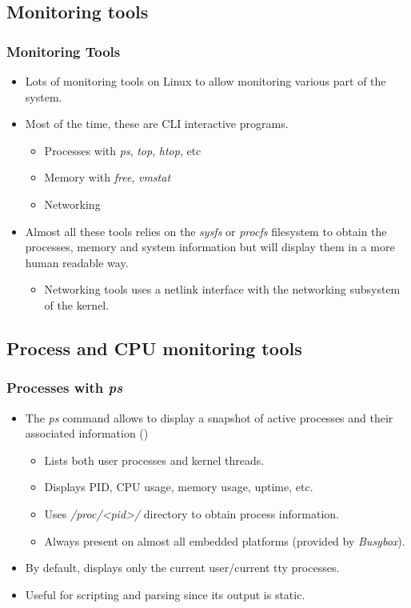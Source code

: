 \subsection{Monitoring tools}

\begin{frame}
  \frametitle{Monitoring Tools}
  \begin{itemize}
    \item Lots of monitoring tools on Linux to allow monitoring various part of
          the system.
    \item Most of the time, these are CLI interactive programs.
    \begin{itemize}
        \item Processes with {\em ps}, {\em top}, {\em htop}, etc
        \item Memory with {\em free}, {\em vmstat}
        \item Networking
    \end{itemize}
    \item Almost all these tools relies on the {\em sysfs} or {\em procfs}
          filesystem to obtain the processes, memory and system information but
          will display them in a more human readable way.
    \begin{itemize}
      \item Networking tools uses a netlink interface with the networking
            subsystem of the kernel.
    \end{itemize}
  \end{itemize}
\end{frame}

\subsection{Process and CPU monitoring tools}

\begin{frame}[fragile]
  \frametitle{Processes with {\em ps}}
  \begin{itemize}
    \item The {\em ps} command allows to display a snapshot of active processes and
          their associated information ()
    \begin{itemize}
      \item Lists both user processes and kernel threads.
      \item Displays PID, CPU usage, memory usage, uptime, etc.
    \end{itemize}
    \begin{itemize}
      \item Uses {\em /proc/<pid>/} directory to obtain process information.
      \item Always present on almost all embedded platforms (provided by
            {\em Busybox}).
    \end{itemize}
    \item By default, displays only the current user/current tty processes.
    \item Useful for scripting and parsing since its output is static.
  \end{itemize}
\end{frame}

